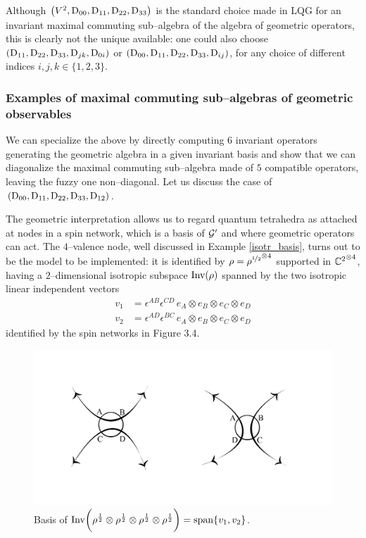 Although $\left(V^2,\text{\normalfont D}_{00},\text{\normalfont D}_{11},\text{\normalfont D}_{22},\text{\normalfont D}_{33}\right)$ is the standard choice made in LQG for an invariant maximal commuting sub--algebra of the algebra of geometric operators, this is clearly not the unique available: one could also choose $\left(\text{\normalfont D}_{11},\text{\normalfont D}_{22},\text{\normalfont D}_{33},\text{\normalfont D}_{jk},\text{\normalfont D}_{0i}\right)$ or $\left(\text{\normalfont D}_{00},\text{\normalfont D}_{11},\text{\normalfont D}_{22},\text{\normalfont D}_{33},\text{\normalfont D}_{ij}\right)$, for any choice of different indices $i,j,k\in\{1,2,3\}$.


\subsubsection{Examples of maximal commuting sub--algebras of geometric observables}
We can specialize the above by directly computing $6$ invariant operators generating the geometric algebra in a given invariant basis and show that we can diagonalize the maximal commuting sub--algebra made of $5$ compatible operators, leaving the fuzzy one non--diagonal. Let us discuss the case of $(\text{\normalfont D}_{00},\text{\normalfont D}_{11},\text{\normalfont D}_{22},\text{\normalfont D}_{33},\text{\normalfont D}_{12})$.

The geometric interpretation allows us to regard quantum tetrahedra as attached at nodes in a spin network, which is a basis of $\mathcal{G}'$ and where geometric operators can act. The $4$--valence node, well discussed in Example \ref{isotr_basis}, turns out to be the model to be implemented: it is identified by $\rho={\rho^{\nicefrac{1}{2}}}^{\otimes 4}$ supported in ${\mathbb{C}^2}^{\otimes 4}$, having a $2$--dimensional isotropic subspace $\text{\normalfont Inv}(\rho)$ spanned by the two isotropic linear independent vectors 
\begin{align*}
    v_1&=\epsilon^{AB}\epsilon^{CD}\,e_A\otimes e_B\otimes e_C\otimes e_D\\
    v_2&=\epsilon^{AD}\epsilon^{BC}\,e_A\otimes e_B\otimes e_C\otimes e_D
\end{align*}
identified by the spin networks in Figure 3.4.
\begin{figure}[ht]
    \centering
    \includegraphics[scale=0.3]{images/2_isotr.jpeg}
    \caption{Basis of $\text{\normalfont Inv}\bigg(\rho^{\frac{1}{2}}\otimes\rho^{\frac{1}{2}}\otimes\rho^{\frac{1}{2}}\otimes\rho^{\frac{1}{2}}\bigg)=\operatorname{span}\{v_1,v_2\}$.}
\end{figure}

